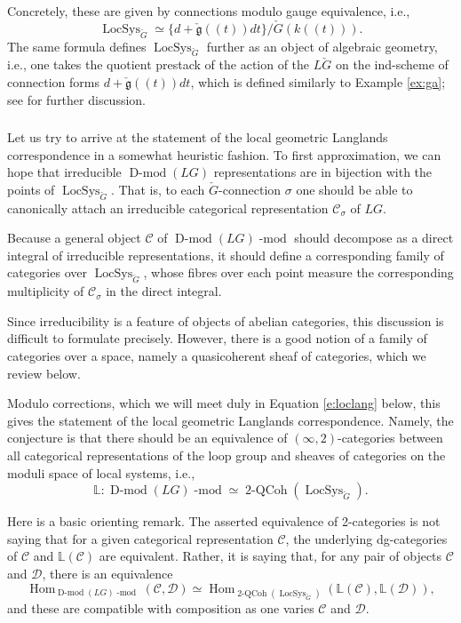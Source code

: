 \documentclass[10pt]{amsart}
\newcommand{\TwoCoh}{\on{2-QCoh}}
\newcommand{\LS}{\on{LocSys}_{\cG}}
\newcommand{\fg}{\mathfrak{g}}
\newcommand{\on}{\operatorname}
\renewcommand{\mod}{\on{-mod}}
\newcommand{\Dmod}{\on{D-mod}}
\theoremstyle{remark}
\newcommand{\Hom}{\operatorname{Hom}}
\newcommand{\sD}{\mathscr{D}}
\numberwithin{equation}{section}
\newcommand{\cfg}{\check{\fg}}
\newcommand{\cG}{\check{G}}
\newcommand{\sC}{\mathscr{C}}
\renewcommand{\mod}{\operatorname{-mod}}
\begin{document}
	 Concretely, these are given by connections modulo gauge 
	equivalence, i.e., 
	\[
	    \LS \simeq \{ d + \cfg(\!(t)\!)dt \} / \cG(k(\!(t)\!)). 
	\]
	The same formula defines $\LS$ further as an object of algebraic geometry, 
	i.e., one takes the quotient prestack of the action of the $L\cG$ on the 
	ind-scheme of connection forms $d + \cfg(\!(t)\!)dt$, which is defined 
	similarly to Example \ref{ex:ga}; see \cite{raskinspectraldecomp} for further discussion. 
	
	
	
	\subsubsection{} \label{s:infdiscuss} Let us try to arrive at the statement of the local 
	geometric Langlands 
	correspondence in a somewhat heuristic fashion. To first approximation, we 
	can hope that irreducible $\Dmod(LG)$ representations are in 
	bijection with the points of $\LS$. That is, to each $\cG$-connection 
	$\sigma$ one should be able to canonically attach an irreducible categorical 
	representation $\sC_{\sigma}$ of $LG$. 
	
	Because a general object $\sC$ of $\Dmod(LG)\mod$ should decompose as a direct 
	integral of irreducible representations, it should define a corresponding 
	family of categories over $\LS$, whose fibres over each point measure the 
	corresponding multiplicity of $\sC_{\sigma}$ in the direct integral. 
	
	Since irreducibility is a feature of objects of abelian categories, 
	this discussion is difficult to formulate precisely. However, there is a 
	good notion of a family of categories over a space, namely a 
	quasicoherent sheaf of categories, which we review below. 
 
    Modulo corrections, which we will meet duly in Equation \eqref{e:loclang} below, this gives the 
    statement of the local geometric Langlands correspondence. Namely, the conjecture is 
    that there should be an equivalence of $(\infty,2)$-categories between all 
    categorical representations of the loop group and sheaves of categories on 
    the moduli space of local systems, i.e., 
    \begin{equation}
    \label{e:loclangnaive}       \mathbb{L}: \Dmod(LG)\mod \simeq 
    \on{2-QCoh}(\LS). 
    \end{equation}

	
	
	
	Here is a basic orienting remark. The asserted equivalence of 2-categories is not saying that for a given categorical representation $\sC$, the underlying 
	dg-categories of $\sC$ and $\mathbb{L}(\sC)$ are equivalent. Rather, it is saying that, for any pair of objects $\sC$ and $\sD$, there is an
	equivalence 
	\[
         \Hom_{\Dmod(LG)\mod}(\sC, \sD) \simeq 
         \Hom_{\TwoCoh(\LS)}(\mathbb{L}(\sC), \mathbb{L}(\sD)),
	\]
	and these are compatible with composition as one varies $\sC$ and $\sD$. 
	
\end{document}
